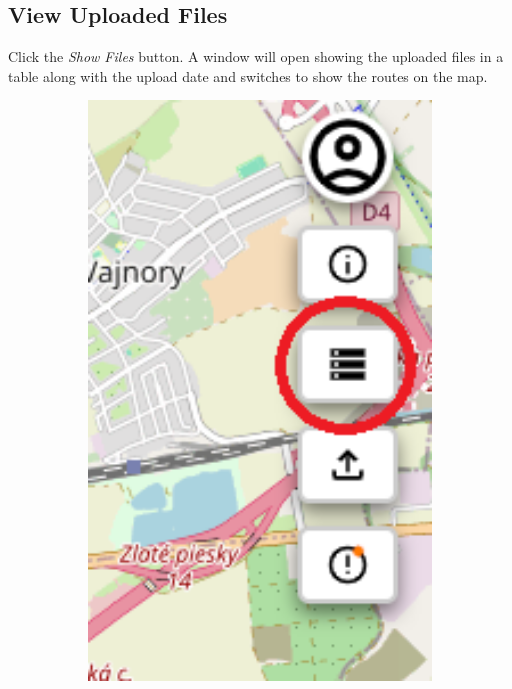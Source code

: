 \subsection{View Uploaded Files\label{section:how_to_open_uploaded_files}}
Click the \textit{Show Files} button. A window will open showing the uploaded files in a table along with the upload date and switches to show the routes on the map.
\begin{figure}[H]
     \centering
     \begin{subfigure}{0.2\textwidth}
         \centering
         \includegraphics[width=1\textwidth]{guide_includes/img/show_files_tool_button.png}

\end{subfigure}
\end{figure}
